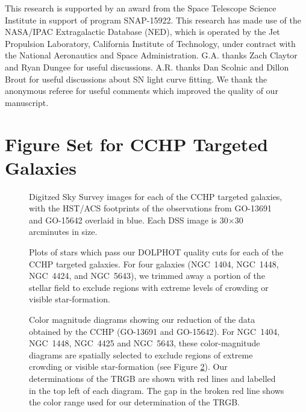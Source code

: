 \documentclass[twocolumn]{aastex62}
\begin{document}

\begin{acknowledgements}

This research is supported by an award from the Space Telescope Science Institute in support of program SNAP-15922. This research has made use of the NASA/IPAC Extragalactic Database (NED), which is operated by the Jet Propulsion Laboratory, California Institute of Technology, under contract with the National Aeronautics and Space Administration.  G.A. thanks Zach Claytor and Ryan Dungee for useful discussions. A.R. thanks Dan Scolnic and Dillon Brout for useful discussions about SN light curve fitting. We thank the anonymous referee for useful comments which improved the quality of our manuscript.

\end{acknowledgements}



\appendix
\section{Figure Set for CCHP Targeted Galaxies}


\begin{figure}
\caption{Digitzed Sky Survey images for each of the CCHP targeted galaxies, with the HST/ACS footprints of the observations from GO-13691 and GO-15642 overlaid in blue. Each DSS image is 30$\times$30 arcminutes in size.}
\label{footprintCollage}
\end{figure}

\begin{figure}
\caption{Plots of stars which pass our DOLPHOT quality cuts for each of the CCHP targeted galaxies. For four galaxies (NGC~1404, NGC~1448, NGC~4424, and NGC~5643), we trimmed away a portion of the stellar field to exclude regions with extreme levels of crowding or visible star-formation.}
\label{starCollage}
\end{figure}


\begin{figure}
\caption{Color magnitude diagrams showing our reduction of the data obtained by the CCHP (GO-13691 and GO-15642). For NGC~1404, NGC~1448, NGC~4425 and NGC~5643, these color-magnitude diagrams are spatially selected to exclude regions of extreme crowding or visible star-formation (see Figure \ref{starCollage}). Our determinations of the TRGB are shown with red lines and labelled in the top left of each diagram. The gap in the broken red line shows the color range used for our determination of the TRGB.}
\label{CMDcollage}
\end{figure}
\end{document}
